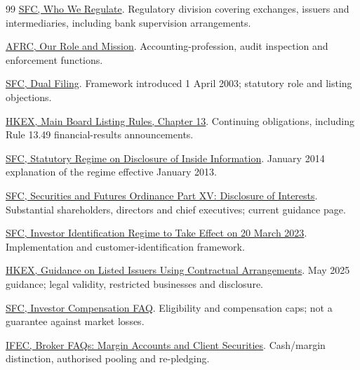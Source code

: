 \documentclass[11pt,a4paper]{article}
\begin{document}
\begin{thebibliography}{99}
 \href{https://www.sfc.hk/en/About-the-SFC/Our-role/Who-we-regulate}{SFC, Who We Regulate}. Regulatory division covering exchanges, issuers and intermediaries, including bank supervision arrangements.

 \href{https://www.afrc.org.hk/en-hk/about-afrc/our-role}{AFRC, Our Role and Mission}. Accounting-profession, audit inspection and enforcement functions.

 \href{https://www.sbz.sfc.hk/en/Regulatory-functions/Corporates/Dual-filing}{SFC, Dual Filing}. Framework introduced 1 April 2003; statutory role and listing objections.

 \href{https://www.hkex.com.hk/-/media/hkex-market/listing/rules-and-guidance/listing-rules-contingency/main-board-listing-rules/equity-securities/chapter_13}{HKEX, Main Board Listing Rules, Chapter 13}. Continuing obligations, including Rule 13.49 financial-results announcements.

 \href{https://apps.sfc.hk/edistributionWeb/api/news/list-content?lang=EN&refNo=14PR2}{SFC, Statutory Regime on Disclosure of Inside Information}. January 2014 explanation of the regime effective January 2013.

 \href{https://www.sfc.hk/en/Rules-and-standards/Securities-and-Futures-Ordinance-Part-XV---Disclosure-of-Interests}{SFC, Securities and Futures Ordinance Part XV: Disclosure of Interests}. Substantial shareholders, directors and chief executives; current guidance page.

 \href{https://apps.sfc.hk/edistributionWeb/gateway/EN/news-and-announcements/news/corporate-news/doc?refNo=23PR10}{SFC, Investor Identification Regime to Take Effect on 20 March 2023}. Implementation and customer-identification framework.

 \href{https://en-rules.hkex.com.hk/sites/default/files/pdf_documents/gl7714_202505.pdf}{HKEX, Guidance on Listed Issuers Using Contractual Arrangements}. May 2025 guidance; legal validity, restricted businesses and disclosure.

 \href{https://www.sfc.hk/TC/faqs/Investor-compensation}{SFC, Investor Compensation FAQ}. Eligibility and compensation caps; not a guarantee against market losses.

 \href{https://www.ifec.org.hk/web/en/investment/market-intermediaries/financial-intermediaries/broker/faqs.page}{IFEC, Broker FAQs: Margin Accounts and Client Securities}. Cash/margin distinction, authorised pooling and re-pledging.


\end{thebibliography}
\end{document}
